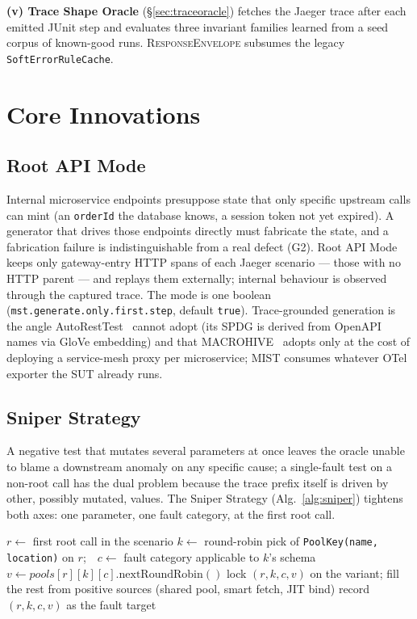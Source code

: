 \documentclass[10pt,conference]{IEEEtran}
\begin{document}
\textbf{(v) Trace Shape Oracle} (\S\ref{sec:traceoracle}) fetches the Jaeger trace after each emitted JUnit step and evaluates three invariant families learned from a seed corpus of known-good runs. \textsc{ResponseEnvelope} subsumes the legacy \texttt{SoftErrorRuleCache}.

\section{Core Innovations}\label{sec:innov}

\subsection{Root API Mode}\label{sec:rootmode}

Internal microservice endpoints presuppose state that only specific upstream calls can mint (an \texttt{orderId} the database knows, a session token not yet expired). A generator that drives those endpoints directly must fabricate the state, and a fabrication failure is indistinguishable from a real defect (G2). Root API Mode keeps only gateway-entry HTTP spans of each Jaeger scenario --- those with no HTTP parent --- and replays them externally; internal behaviour is observed through the captured trace. The mode is one boolean (\texttt{mst.gener\-ate.only.first.step}, default \texttt{true}). Trace-grounded generation is the angle AutoRestTest~\cite{Stennett2025AutoRestTest} cannot adopt (its SPDG is derived from OpenAPI names via GloVe embedding) and that MACROHIVE~\cite{Giamattei2022MACROHIVE} adopts only at the cost of deploying a service-mesh proxy per microservice; MIST consumes whatever OTel exporter the SUT already runs.

\subsection{Sniper Strategy}\label{sec:sniper}

A negative test that mutates several parameters at once leaves the oracle unable to blame a downstream anomaly on any specific cause; a single-fault test on a non-root call has the dual problem because the trace prefix itself is driven by other, possibly mutated, values. The Sniper Strategy (Alg.~\ref{alg:sniper}) tightens both axes: one parameter, one fault category, at the first root call.

\begin{algorithm}[t]
\caption{Sniper variant generation.}\label{alg:sniper}
\begin{algorithmic}[1]
\State $r \gets$ first root call in the scenario
\State $k \gets$ round-robin pick of \texttt{PoolKey(name, location)} on $r$;\ \  $c \gets$ fault category applicable to $k$'s schema
\State $v \gets pools[r][k][c].\textrm{nextRoundRobin}()$
\State lock $(r, k, c, v)$ on the variant; fill the rest from positive sources (shared pool, smart fetch, JIT bind)
\State record $(r, k, c, v)$ as the fault target
\end{algorithmic}
\end{algorithm}
\end{document}
